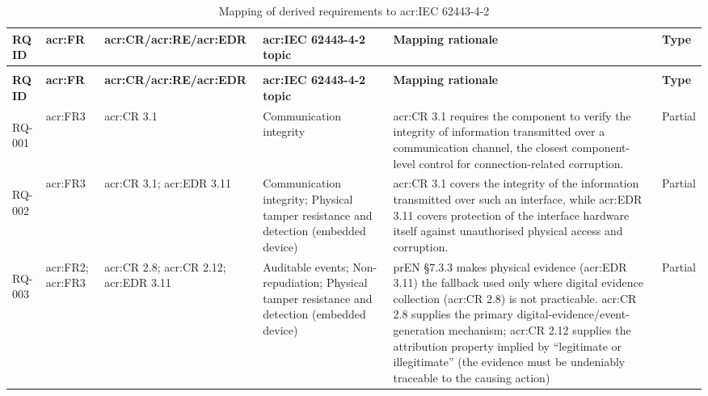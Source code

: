 \footnotesize
\begin{longtable}{|>{\bfseries}p{1.0cm}|p{0.9cm}|p{2.4cm}|p{2.4cm}|p{4.8cm}|p{1.8cm}|}
	\caption{Mapping of derived requirements to \gls{acr:IEC} 62443-4-2} 
	\label{tab:mvo-pren-iec62443-mapping} \\
	\hline
	\textbf{RQ ID} & \textbf{\gls{acr:FR}} & \textbf{\gls{acr:CR}/\gls{acr:RE}/\gls{acr:EDR}} & \textbf{\gls{acr:IEC} 62443-4-2 topic} & \textbf{Mapping rationale} & \textbf{Type} \\
	\hline
	\endfirsthead
	
	\multicolumn{6}{c}{\tablename\ \thetable{} continued from previous page} \\
	\hline
	\textbf{RQ ID} & \textbf{\gls{acr:FR}} & \textbf{\gls{acr:CR}/\gls{acr:RE}/\gls{acr:EDR}} & \textbf{\gls{acr:IEC} 62443-4-2 topic} & \textbf{Mapping rationale} & \textbf{Type} \\
	\hline
	\endhead
	
	
	\hline
	\endlastfoot
	
	RQ-001 &
	\gls{acr:FR}3 &
	\gls{acr:CR} 3.1 &
	Communication integrity &
	\gls{acr:CR} 3.1 requires the component to verify the integrity of information transmitted over a communication channel, the closest component-level control for connection-related corruption. &
	Partial \\
	\hline
	
	RQ-002 &
	\gls{acr:FR}3 &
	\gls{acr:CR} 3.1; \newline \gls{acr:EDR} 3.11 &
	Communication integrity; Physical tamper resistance and detection (embedded device) &
	\gls{acr:CR} 3.1 covers the integrity of the information transmitted over such an interface, while \gls{acr:EDR} 3.11 covers protection of the interface hardware itself against unauthorised physical access and corruption. &
	Partial \\
	\hline
	
	RQ-003 &
	\gls{acr:FR}2; \gls{acr:FR}3 &
	\gls{acr:CR} 2.8; \newline \gls{acr:CR} 2.12; \newline \gls{acr:EDR} 3.11 &
	Auditable events; Non-repudiation; Physical tamper resistance and detection (embedded device) &
	prEN \S7.3.3 makes physical evidence (\gls{acr:EDR} 3.11) the fallback used only where digital evidence collection (\gls{acr:CR} 2.8) is not practicable. \gls{acr:CR} 2.8 supplies the primary digital-evidence/event-generation mechanism; \gls{acr:CR} 2.12 supplies the attribution property implied by ``legitimate or illegitimate'' (the evidence must be undeniably traceable to the causing action) &
	Partial \\
	\hline
	

\end{longtable}

